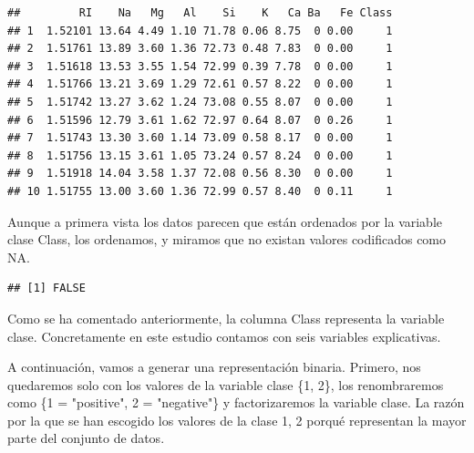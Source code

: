 \documentclass[]{article}
\newenvironment{Shaded}{\begin{snugshade}}{\end{snugshade}}
\newcommand{\ControlFlowTok}[1]{\textcolor[rgb]{0.13,0.29,0.53}{\textbf{#1}}}
\newcommand{\DecValTok}[1]{\textcolor[rgb]{0.00,0.00,0.81}{#1}}
\newcommand{\KeywordTok}[1]{\textcolor[rgb]{0.13,0.29,0.53}{\textbf{#1}}}
\newcommand{\NormalTok}[1]{#1}
\newcommand{\OperatorTok}[1]{\textcolor[rgb]{0.81,0.36,0.00}{\textbf{#1}}}
\newcommand{\StringTok}[1]{\textcolor[rgb]{0.31,0.60,0.02}{#1}}
\begin{document}
\begin{verbatim}
##         RI    Na   Mg   Al    Si    K   Ca Ba   Fe Class
## 1  1.52101 13.64 4.49 1.10 71.78 0.06 8.75  0 0.00     1
## 2  1.51761 13.89 3.60 1.36 72.73 0.48 7.83  0 0.00     1
## 3  1.51618 13.53 3.55 1.54 72.99 0.39 7.78  0 0.00     1
## 4  1.51766 13.21 3.69 1.29 72.61 0.57 8.22  0 0.00     1
## 5  1.51742 13.27 3.62 1.24 73.08 0.55 8.07  0 0.00     1
## 6  1.51596 12.79 3.61 1.62 72.97 0.64 8.07  0 0.26     1
## 7  1.51743 13.30 3.60 1.14 73.09 0.58 8.17  0 0.00     1
## 8  1.51756 13.15 3.61 1.05 73.24 0.57 8.24  0 0.00     1
## 9  1.51918 14.04 3.58 1.37 72.08 0.56 8.30  0 0.00     1
## 10 1.51755 13.00 3.60 1.36 72.99 0.57 8.40  0 0.11     1
\end{verbatim}

Aunque a primera vista los datos parecen que están ordenados por la variable clase Class, los ordenamos, y miramos que no existan valores codificados como NA.

\begin{Shaded}
\end{Shaded}

\begin{verbatim}
## [1] FALSE
\end{verbatim}

Como se ha comentado anteriormente, la columna Class representa la variable clase. Concretamente en este estudio contamos con seis variables explicativas.

A continuación, vamos a generar una representación binaria. Primero, nos quedaremos solo con los valores de la variable clase \{1, 2\}, los renombraremos como \{1 = "positive", 2 = "negative"\} y factorizaremos la variable clase. La razón por la que se han escogido los valores de la clase {1, 2} porqué representan la mayor parte del conjunto de datos.

\newpage

\begin{Shaded}
\end{Shaded}
\end{document}

